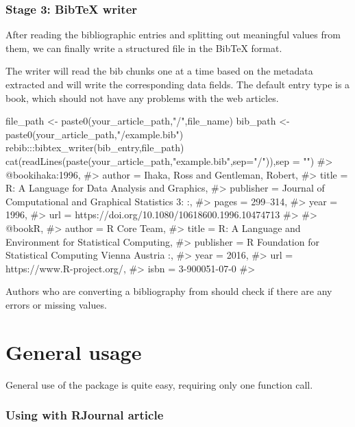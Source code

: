 \subsubsection{Stage 3: BibTeX writer}

After reading the bibliographic entries and splitting out meaningful values from them, we can finally write a structured file in the BibTeX format.

The writer will read the bib chunks one at a time based on the metadata extracted and will write the corresponding data fields. The default entry type is a book, which should not have any problems with the web articles. 
\begin{Schunk}

\begin{Sinput}
file_path <- paste0(your_article_path,"/",file_name)
bib_path <- paste0(your_article_path,"/example.bib")
rebib:::bibtex_writer(bib_entry,file_path)
cat(readLines(paste(your_article_path,"example.bib",sep="/")),sep = "\n")
#> @book{ihaka:1996,
#> author = {{Ihaka, Ross and Gentleman, Robert}},
#> title = {{R: A Language for Data Analysis and Graphics}},
#> publisher = {Journal of Computational and Graphical Statistics 3:   :},
#> pages = {299--314},
#> year = {1996},
#> url = {https://doi.org/10.1080/10618600.1996.10474713}
#> }
#> @book{R,
#> author = {R {Core Team}},
#> title = {{R: A Language and Environment for Statistical Computing}},
#> publisher = {R Foundation for Statistical Computing Vienna Austria    :},
#> year = {2016},
#> url = {https://www.R-project.org/},
#> isbn = {3-900051-07-0}
#> }
\end{Sinput}
\end{Schunk}

Authors who are converting a bibliography from  should check if there are any errors or missing values. 



\section{General usage}

General use of the  package is quite easy, requiring only one function call.

\subsubsection{Using with RJournal article}

